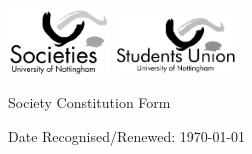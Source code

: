 \documentclass[a4paper,twoside,notitlepage,11pt]{article}
\newcommand{\paperTitle}{Society Constitution Form}
\begin{document}
\begin{center}
\includegraphics[width=0.2\textwidth]{img/socLogo.png}
\includegraphics[width=0.25\textwidth]{img/suLogo.png}
\ \\
	\begin{LARGE}
		\paperTitle \\
	\end{LARGE}
\end{center}
\begin{flushright}
Date Recognised/Renewed: \today \\
\end{flushright}
\end{document}
